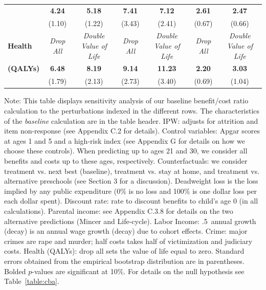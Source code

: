 \documentclass[static]{JJH-Beamer}
\begin{document}
\begin{frame}
\begin{table}[H]
\begin{center}
{\begin{tabular}{>{\bfseries}lcc|cc|cc}
	&	\textbf{4.24}	&	\textbf{5.18}	&	\textbf{7.41}	&	\textbf{7.12}	&	\textbf{2.61}	&	\textbf{2.47}	\\
	&	(1.10)	&	(1.22)	&	(3.43)	&	(2.41)	&	(0.67)	&	(0.66)	\\ \midrule
Health	&	\textit{Drop All}	&	\textit{Double Value of Life}	&	\textit{Drop All}	&	\textit{Double Value of Life}	&	\textit{Drop All}	&	\textit{Double Value of Life}	\\
(QALYs)	&	\textbf{6.48}	&	\textbf{8.19}	&	\textbf{9.14}	&	\textbf{11.23}	&	\textbf{2.20}	&	\textbf{3.03}	\\
	&	(1.79)	&	(2.13)	&	(2.73)	&	(3.40)	&	(0.69)	&	(1.04)	\\ \bottomrule
\end{tabular}
}
\end{center}
\end{table}

\end{frame}

{\flushleft \small Note: This table displays sensitivity analysis of our baseline benefit/cost ratio calculation to the perturbations indexed in the different rows. The characteristics of the \textit{baseline} calculation are in the table header. IPW: adjusts for attrition and item non-response (see Appendix C.2 for details). Control variables: Apgar scores at ages 1 and 5 and a high-risk index (see Appendix G for details on how we choose these controls). When predicting up to ages 21 and 30, we consider all benefits and costs up to these ages, respectively. Counterfactuals: we consider treatment vs. next best (baseline), treatment vs. stay at home, and treatment vs. alternative preschools (see Section 3 for a discussion). Deadweight loss is the loss implied by any public expenditure (0\% is no loss and 100\% is one dollar loss per each dollar spent). Discount rate: rate to discount benefits to child's age 0 (in all calculations). Parental income: see Appendix C.3.8 for details on the two alternative predictions (Mincer and Life-cycle). Labor Income: .5\ annual growth (decay) is an annual wage growth (decay) due to cohort effects. Crime: major crimes are rape and murder; half costs takes half of victimization and judiciary costs. Health (QALYs): drop all sets the value of life equal to zero. Standard errors obtained from the empirical bootstrap distribution are in parentheses. Bolded $p$-values are significant at 10\%. For details on the null hypothesis see Table~\ref{table:cba}.\\}
\end{document}

